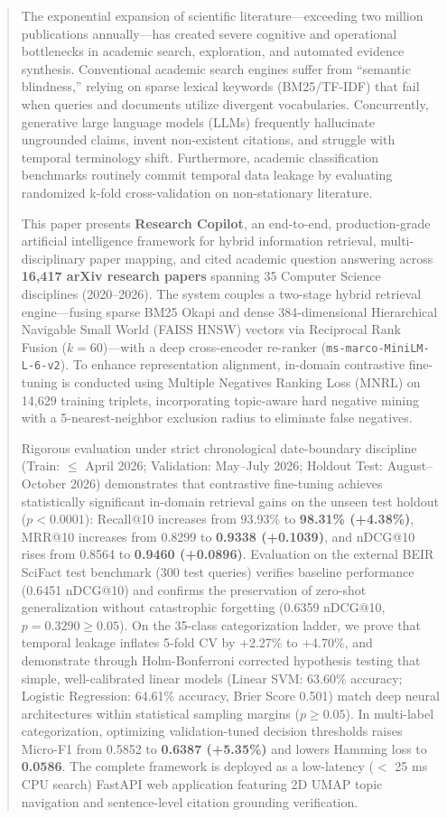 \documentclass[journal]{IEEEtran}
\begin{document}
\begin{abstract}
The exponential expansion of scientific literature---exceeding two million publications annually---has created severe cognitive and operational bottlenecks in academic search, exploration, and automated evidence synthesis. Conventional academic search engines suffer from ``semantic blindness,'' relying on sparse lexical keywords (BM25/TF-IDF) that fail when queries and documents utilize divergent vocabularies. Concurrently, generative large language models (LLMs) frequently hallucinate ungrounded claims, invent non-existent citations, and struggle with temporal terminology shift. Furthermore, academic classification benchmarks routinely commit temporal data leakage by evaluating randomized k-fold cross-validation on non-stationary literature.

This paper presents \textbf{Research Copilot}, an end-to-end, production-grade artificial intelligence framework for hybrid information retrieval, multi-disciplinary paper mapping, and cited academic question answering across \textbf{16,417 arXiv research papers} spanning 35 Computer Science disciplines (2020--2026). The system couples a two-stage hybrid retrieval engine---fusing sparse BM25 Okapi and dense 384-dimensional Hierarchical Navigable Small World (FAISS HNSW) vectors via Reciprocal Rank Fusion ($k=60$)---with a deep cross-encoder re-ranker (\texttt{ms-marco-MiniLM-L-6-v2}). To enhance representation alignment, in-domain contrastive fine-tuning is conducted using Multiple Negatives Ranking Loss (MNRL) on 14,629 training triplets, incorporating topic-aware hard negative mining with a 5-nearest-neighbor exclusion radius to eliminate false negatives.

Rigorous evaluation under strict chronological date-boundary discipline (Train: $\le$ April 2026; Validation: May--July 2026; Holdout Test: August--October 2026) demonstrates that contrastive fine-tuning achieves statistically significant in-domain retrieval gains on the unseen test holdout ($p < 0.0001$): Recall@10 increases from 93.93\% to \textbf{98.31\% (+4.38\%)}, MRR@10 increases from 0.8299 to \textbf{0.9338 (+0.1039)}, and nDCG@10 rises from 0.8564 to \textbf{0.9460 (+0.0896)}. Evaluation on the external BEIR SciFact test benchmark (300 test queries) verifies baseline performance (0.6451 nDCG@10) and confirms the preservation of zero-shot generalization without catastrophic forgetting (0.6359 nDCG@10, $p = 0.3290 \ge 0.05$). On the 35-class categorization ladder, we prove that temporal leakage inflates 5-fold CV by +2.27\% to +4.70\%, and demonstrate through Holm-Bonferroni corrected hypothesis testing that simple, well-calibrated linear models (Linear SVM: 63.60\% accuracy; Logistic Regression: 64.61\% accuracy, Brier Score 0.501) match deep neural architectures within statistical sampling margins ($p \ge 0.05$). In multi-label categorization, optimizing validation-tuned decision thresholds raises Micro-F1 from 0.5852 to \textbf{0.6387 (+5.35\%)} and lowers Hamming loss to \textbf{0.0586}. The complete framework is deployed as a low-latency ($<$ 25 ms CPU search) FastAPI web application featuring 2D UMAP topic navigation and sentence-level citation grounding verification.
\end{abstract}
\end{document}
